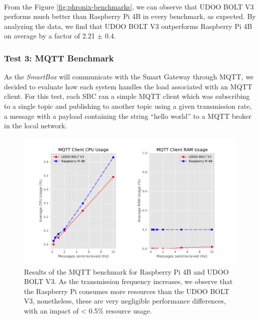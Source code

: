 \paragraph{} From the Figure \ref{fig:phronix-benchmarks}, we can observe that UDOO BOLT V3 performs much better than Raspberry Pi 4B in every benchmark, as expected. By analyzing the data, we find that UDOO BOLT V3 outperforms Raspberry Pi 4B on average by a factor of 2.21 $\pm$ 0.4.

\subsubsection{Test 3: \acs{MQTT} Benchmark}

As the \textit{SmartBox} will communicate with the Smart Gateway through \acs{MQTT}, we decided to evaluate how each system handles the load associated with an \acs{MQTT} client. For this test, each \acs{SBC} ran a simple \acs{MQTT} client which was subscribing to a single topic and publishing to another topic using a given transmission rate, a message with a payload containing the string ``hello world'' to a \acs{MQTT} broker in the local network.

\begin{figure}[H]
    \centering
    \includegraphics[width=\linewidth]{images/mqtt_test_results.pdf}
    \caption[Results of the \acs{MQTT} benchmark for Raspberry Pi 4B and UDOO BOLT V3.]{Results of the \acs{MQTT} benchmark for Raspberry Pi 4B and UDOO BOLT V3. As the transmission frequency increases, we observe that the Raspberry Pi consumes more resources than the UDOO BOLT V3, nonetheless, these are very negligible performance differences, with an impact of < 0.5\% resource usage.}
    \label{fig:mqtt-tests}
\end{figure}

